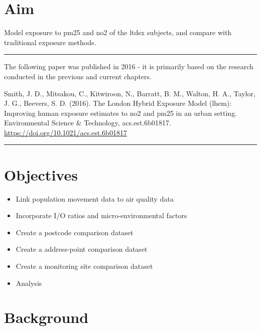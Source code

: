 \section{Aim}
\label{sec:2aim}

Model exposure to \gls{pm25} and \gls{no2} of the \gls{ltdsx} subjects, and compare  with traditional exposure methods.

\noindent\rule{10cm}{0.4pt}

The following paper was published in 2016 - it is primarily based on the research conducted in the previous and current chapters.

Smith, J. D., Mitsakou, C., Kitwiroon, N., Barratt, B. M., Walton, H. A., Taylor, J. G., Beevers, S. D. (2016). The London Hybrid Exposure Model (\gls{lhem}): Improving human exposure estimates to \gls{no2} and \gls{pm25} in an urban setting. Environmental Science \& Technology, acs.est.6b01817. \url{https://doi.org/10.1021/acs.est.6b01817}

\noindent\rule{10cm}{0.4pt}

\section{Objectives}
\label{sec:2objectives}

\begin{itemize}
\item Link population movement data to air quality data
\item Incorporate I/O ratios and micro-environmental factors
\item Create a postcode comparison dataset
\item Create a address-point comparison dataset
\item Create a monitoring site comparison dataset
\item Analysis
\end{itemize}

\section{Background}
\label{sec:2background}

